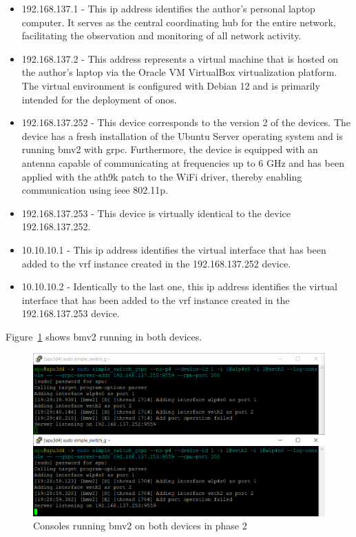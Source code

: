 \begin{itemize}
	\item 192.168.137.1 - This \gls{ip} address identifies the author's personal laptop computer. It serves as the central coordinating hub for the entire network, facilitating the observation and monitoring of all network activity.
	\item 192.168.137.2 - This address represents a virtual machine that is hosted on the author's laptop via the Oracle VM VirtualBox virtualization platform. The virtual environment is configured with Debian 12 and is primarily intended for the deployment of \gls{onos}.
	\item 192.168.137.252 - This device corresponds to the version 2 of the devices. The device has a fresh installation of the Ubuntu Server operating system and is running \gls{bmv2} with grpc. Furthermore, the device is equipped with an antenna capable of communicating at frequencies up to 6 GHz and has been applied with the ath9k patch to the WiFi driver, thereby enabling communication using \gls{ieee} 802.11p.
	\item 192.168.137.253 - This device is virtually identical to the device 192.168.137.252.
	\item 10.10.10.1 - This \gls{ip} address identifies the virtual interface that has been added to the \gls{vrf} instance created in the 192.168.137.252 device.
	\item 10.10.10.2 - Identically to the last one, this \gls{ip} address identifies the virtual interface that has been added to the \gls{vrf} instance created in the 192.168.137.253 device.
\end{itemize}



Figure~\ref{fig:exp2_phase2_bmv2} shows \gls{bmv2} running in both devices.

\begin{figure}
	\centering
	\includegraphics[width=\textwidth]{Chapters/Figures/tests/bmv2_phase_2/bmv2_running.PNG}
	\caption{Consoles running \gls{bmv2} on both devices in phase 2}
	\label{fig:exp2_phase2_bmv2}
\end{figure}

